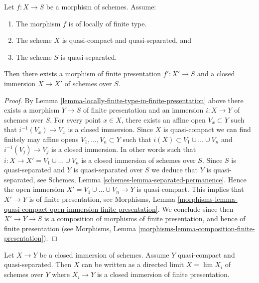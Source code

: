 \begin{lemma}
\label{lemma-finite-type-closed-in-finite-presentation}
Let $f : X \to S$ be a morphism of schemes.
Assume:
\begin{enumerate}
\item The morphism $f$ is of locally of finite type.
\item The scheme $X$ is quasi-compact and quasi-separated, and
\item The scheme $S$ is quasi-separated.
\end{enumerate}
Then there exists a morphism of finite presentation
$f' : X' \to S$ and a closed immersion $X \to X'$ of schemes over $S$.
\end{lemma}

\begin{proof}
By Lemma \ref{lemma-locally-finite-type-in-finite-presentation} above
there exists a morphism $Y \to S$ of finite presentation and an
immersion $i : X \to Y$ of schemes over $S$.
For every point $x \in X$, there exists an affine open
$V_x \subset Y$ such that $i^{-1}(V_x) \to V_x$ is a
closed immersion. Since $X$ is quasi-compact we can find
finitely may affine opens $V_1, \ldots, V_n \subset Y$
such that $i(X) \subset V_1 \cup \ldots \cup V_n$ and
$i^{-1}(V_j) \to V_j$ is a closed immersion. In other words
such that $i : X \to X' = V_1 \cup \ldots \cup V_n$ is a
closed immersion of schemes over $S$.
Since $S$ is quasi-separated and $Y$ is quasi-separated over $S$
we deduce that $Y$ is quasi-separated, see
Schemes, Lemma \ref{schemes-lemma-separated-permanence}.
Hence the open immersion $X' = V_1 \cup \ldots \cup V_n \to Y$
is quasi-compact. This implies that
$X' \to Y$ is of finite presentation, see
Morphisms,
Lemma \ref{morphisms-lemma-quasi-compact-open-immersion-finite-presentation}.
We conclude since then $X' \to Y \to S$ is a composition of morphisms
of finite presentation, and hence of finite presentation (see
Morphisms, Lemma \ref{morphisms-lemma-composition-finite-presentation}).
\end{proof}

\begin{lemma}
\label{lemma-closed-is-limit-closed-and-finite-presentation}
Let $X \to Y$ be a closed immersion of schemes. Assume $Y$ quasi-compact and
quasi-separated. Then $X$ can be written as a directed limit $X = \lim X_i$
of schemes over $Y$ where $X_i \to Y$ is a closed immersion
of finite presentation.
\end{lemma}

